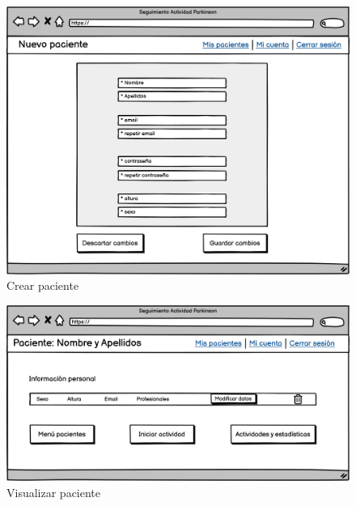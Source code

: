 \begin{figure}[h]
    \centering
    \includegraphics[width=1\textwidth]{img/UI_Wireframes/UI_CU-28_Crear paciente.png}
    \caption{Crear paciente}
    \label{fig:Crear paciente}
\end{figure}

\begin{figure}[h]
    \centering
    \includegraphics[width=1\textwidth]{img/UI_Wireframes/UI_CU-30_Visualizar paciente.png}
    \caption{Visualizar paciente}
    \label{fig:Visualizar paciente}
\end{figure}